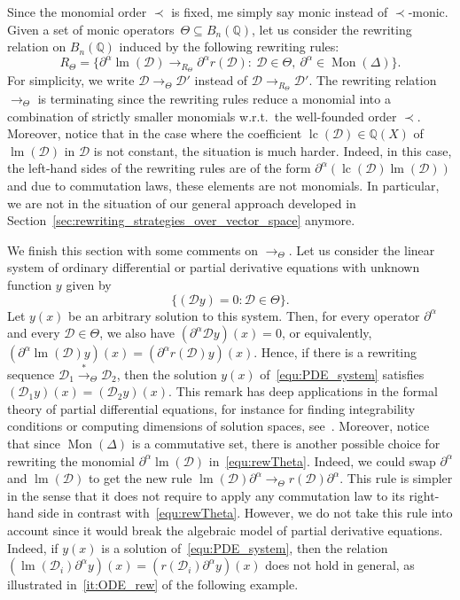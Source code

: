 \documentclass[11pt]{article}
\theoremstyle{definition}
\newcommand\wrt{w.r.t.}
\newcommand\D{\mathcal{D}}
\DeclareMathOperator{\lm}{lm}
\DeclareMathOperator{\lc}{lc}
\newcommand\Q{\mathbb{Q}}
\newcommand\Weyl[1]{B_{#1}(\Q)}
\newcommand\monBasis{\Mon(\Delta)}
\DeclareMathOperator{\Mon}{Mon}
\newcommand\rewTheta{\to_\Theta}
\newcommand\transTheta{\overset{*}{\to}_\Theta}
\newcommand\RTheta{R_{\Theta}}
\begin{document}
Since the monomial order $\prec$ is fixed, me simply say monic instead of
$\prec$-monic. Given a set of monic operators~$\Theta\subseteq\Weyl{n}$,
let us consider the rewriting relation on $\Weyl{n}$ induced by the
following rewriting rules: 
\begin{equation}\label{equ:rewTheta}
  \RTheta=\Big\{\partial^\alpha\lm(\D)\to_{\RTheta}\partial^\alpha
  r(\D):\ \D\in\Theta,\ \partial^\alpha\in\Mon(\Delta)\Big\}.
\end{equation}
For simplicity, we write $\D\rewTheta\D'$ instead of
$\D\to_{R_\Theta}\D'$. The rewriting relation $\rewTheta$ is terminating
since the rewriting rules reduce a monomial into a combination of
strictly smaller monomials \wrt\ the well-founded order $\prec$.
Moreover, notice that in the case where the coefficient $\lc(\D)\in\Q(X)$
of~$\lm(\D)$ in $\D$ is not constant, the situation is much harder.
Indeed, in this case, the left-hand sides of the rewriting rules are of
the form $\partial^\alpha(\lc(\D)\lm(\D))$ and due to commutation laws,
these elements are not monomials. In particular, we are not in the
situation of our general approach developed in  
Section~\ref{sec:rewriting_strategies_over_vector_space} anymore.
\medskip

We finish this section with some comments on $\rewTheta$. Let us consider 
the linear system of ordinary differential or partial derivative
equations with unknown function $y$ given by 
\begin{equation}\label{equ:PDE_system}
  \{(\D y)=0:\D\in\Theta\}.
\end{equation}
Let $y(x)$ be an arbitrary solution to this system. Then, for every
operator $\partial^\alpha$ and every $\D\in\Theta$, we also have
$(\partial^\alpha\D y)(x)=0$, or equivalently,
$(\partial^\alpha\lm(\D)y)(x)=(\partial^\alpha r(\D)y)(x)$. Hence, if
there is a rewriting sequence $\D_1\transTheta\D_2$, then the solution
$y(x)$ of~\eqref{equ:PDE_system} satisfies $(\D_1y)(x)=(\D_2y)(x)$. This
remark has deep applications in the formal theory of partial differential
equations, for instance for finding integrability conditions or computing
dimensions of solution spaces, see~\cite{MR1308976}. Moreover, notice
that since $\monBasis$ is a commutative set, there is another possible
choice for rewriting the monomial $\partial^\alpha\lm(\D)$
in~\eqref{equ:rewTheta}. Indeed, we could swap $\partial^\alpha$ and
$\lm(\D)$ to get the new rule
$\lm(\D)\partial^\alpha\rewTheta r(\D)\partial^\alpha$. This rule is
simpler in the sense that it does not require to apply any commutation 
law to its right-hand side in contrast with~\eqref{equ:rewTheta}.
However, we do not take this rule into account since it would break the
algebraic model of partial derivative equations. Indeed, if $y(x)$ is a
solution of~\eqref{equ:PDE_system}, then the relation
$(\lm(\D_i)\partial^\alpha y)(x)=(r(\D_i)\partial^\alpha y)(x)$ does not
hold in general, as illustrated in~\ref{it:ODE_rew} of the following
example.
\smallskip
\end{document}
